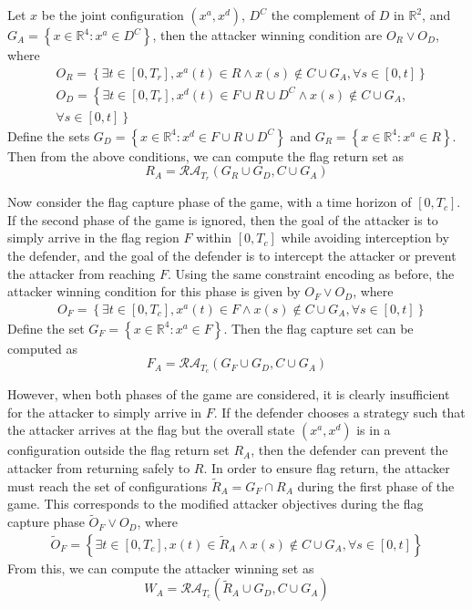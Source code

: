 \documentclass[letterpaper, 10 pt, conference]{ieeeconf}  %
\numberwithin{algorithm}{section}
\begin{document}
Let $x$ be the joint configuration $(x^a, x^d)$, $D^C$ the complement of $D$ in $\mathbb{R}^2$, and $G_A = \left\{x \in \mathbb{R}^4: x^a \in D^C \right\}$, then the attacker winning condition are $O_R \vee O_D$, where
\begin{align*}
&O_R = \left\{\exists t \in [0,T_r], x^a(t) \in R \wedge x(s) \notin C \cup G_A, \forall s \in [0,t]\right\} \\
&O_D = \left\{\exists t \in [0,T_r], x^d(t) \in F \cup R \cup D^C \wedge x(s) \notin C \cup G_A, \right. \\
&\left. \forall s \in [0,t]\right\}
\end{align*}
Define the sets $G_D = \left\{x \in \mathbb{R}^4: x^d \in F \cup R \cup D^C \right\}$ and $G_R = \left\{x \in \mathbb{R}^4: x^a \in R \right\}$. Then from the above conditions, we can compute the flag return set as
\begin{equation}
R_A = \mathcal{RA}_{T_r}(G_R \cup G_D, C \cup G_A)
\end{equation}

Now consider the flag capture phase of the game, with a time horizon of $[0,T_c]$. If the second phase of the game is ignored, then the goal of the attacker is to simply arrive in the flag region $F$ within $[0,T_c]$ while avoiding interception by the defender, and the goal of the defender is to intercept the attacker or prevent the attacker from reaching $F$. Using the same constraint encoding as before, the attacker winning condition for this phase is given by
$O_F \vee O_D$, where
\begin{align*}
&O_F = \left\{\exists t \in [0,T_c], x^a(t) \in F \wedge x(s) \notin C \cup G_A, \forall s \in [0,t]\right\} 
\end{align*}
Define the set $G_F = \left\{x \in \mathbb{R}^4: x^a \in F \right\}$. Then the flag capture set can be computed as
\begin{equation}
F_A = \mathcal{RA}_{T_c}(G_F \cup G_D, C \cup G_A)
\end{equation}

However, when both phases of the game are considered, it is clearly insufficient for the attacker to simply arrive in $F$. If the defender chooses a strategy such that the attacker arrives at the flag but the overall state $(x^a, x^d)$ is in a configuration outside the flag return set $R_A$, then the defender can prevent the attacker from returning safely to $R$. In order to ensure flag return, the attacker must reach the set of configurations $\tilde{R}_A = G_F \cap R_A$ during the first phase of the game. This corresponds to the modified attacker objectives during the flag capture phase $\tilde{O}_F \vee O_D$, where
\begin{align*}
\tilde{O}_F\! =\!\left\{\exists t \in \![0,T_c], x(t) \!\in \!\tilde{R}_A \wedge x(s)\! \notin \!C \cup G_A, \forall s \in [0,t]\right\}
\end{align*}
From this, we can compute the attacker winning set as
\begin{equation}
W_A = \mathcal{RA}_{T_c}(\tilde{R}_A \cup G_D, C \cup G_A)
\end{equation}
\end{document}
